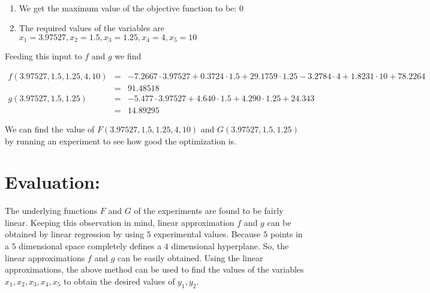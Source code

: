 \documentclass[11pt]{article}
\begin{document}
\paragraph{}
\begin{enumerate}
\item We get the maximum value of the objective function to be: $0$
\item The required values of the variables are $x_1 = 3.97527,x_2 = 1.5,x_3 = 1.25, x_4 = 4, x_5 = 10$
\end{enumerate}
Feeding this input to $f$ and $g$ we find
\begin{tiny}
\begin{eqnarray*}
f(3.97527,1.5,1.25, 4, 10) &=& -7.2667 \cdot 3.97527 + 0.3724 \cdot 1.5 + 29.1759 \cdot 1.25 - 3.2784 \cdot 4 + 1.8231 \cdot 10 + 78.2264\\
&=& 91.48518\\
g(3.97527,1.5,1.25) &=& -5.477 \cdot 3.97527 + 4.640 \cdot 1.5 + 4.290  \cdot 1.25 + 24.343\\
&=& 14.89295
\end{eqnarray*}
\end{tiny}
We can find the value of $F(3.97527,1.5,1.25, 4, 10)$ and $G(3.97527,1.5,1.25)$ by running an experiment to see how good the optimization is.


\section{Evaluation:}
The underlying functions $F$ and $G$ of the experiments are found to be fairly linear. Keeping this observation in mind, linear approximation $f$ and $g$ can be obtained by linear regression by using $5$ experimental values. Because $5$ points in a $5$ dimensional space completely defines a $4$ dimensional hyperplane. So, the linear approximations $f$ and $g$ can be easily obtained. Using the linear approximations, the above method can be used to find the values of the variables $x_1,x_2,x_3,x_4,x_5$ to obtain the desired values of $y_1,y_2$.
\end{document}
